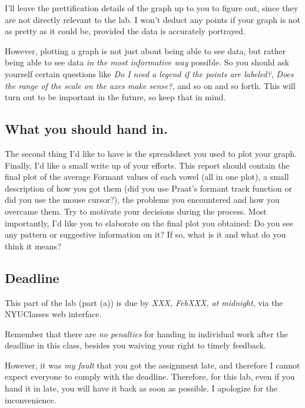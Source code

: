 I'll leave the prettification details of the graph up to you to figure out, since they are not directly relevant to the lab. I won't deduct any points if your graph is not as pretty as it could be, provided the data is accurately portrayed.

However, plotting a graph is not just about being able to see data, but rather being able to see data \emph{in the most informative way} possible. So you should ask yourself certain questions like \emph{Do I need a legend if the points are labeled?}, \emph{Does the range of the scale on the axes make sense?}, and so on and so forth. This will turn out to be important in the future, so keep that in mind.

\subsection{What you should hand in.}

The second thing I'd like to have is the \MSExcel{} spreadsheet you used to plot your graph. Finally, I'd like a small write up of your efforts. This report should contain the final plot of the average Formant values of each vowel (all in one plot), a small description of how you got them (did you use Praat's formant track function or did you use the mouse cursor?), the problems you encountered and how you overcame them. Try to motivate your decisions during the process. Most importantly, I'd like you to elaborate on the final plot you obtained: Do you see any pattern or suggestive information on it? If so, what is it and what do you think it means?

\subsection{Deadline}

This part of the lab (part (a)) is due by \emph{XXX, FebXXX, at midnight}, via the NYUClasses web interface.

Remember that there are \emph{no penalties} for handing in individual work after the deadline in this class, besides you waiving your right to timely feedback.

However, it was \emph{my fault} that you got the assignment late, and therefore I cannot expect everyone to comply with the deadline. Therefore, for this lab, even if you hand it in late, you will have it back as soon as possible. I apologize for the inconvenience.
